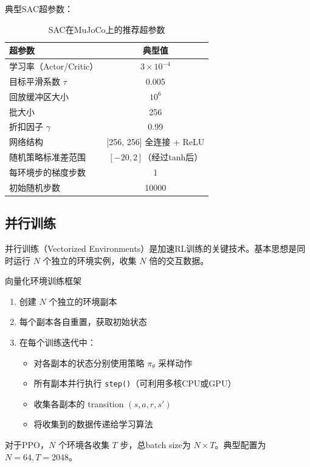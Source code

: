 典型SAC超参数：
\begin{table}[htbp]
\centering
\caption{SAC在MuJoCo上的推荐超参数}
\label{tab:sac_hp}
\begin{tabular}{lc}
\toprule
超参数 & 典型值 \\
\midrule
学习率（Actor/Critic） & $3 \times 10^{-4}$ \\
目标平滑系数 $\tau$ & 0.005 \\
回放缓冲区大小 & $10^6$ \\
批大小 & 256 \\
折扣因子 $\gamma$ & 0.99 \\
网络结构 & [256, 256] 全连接 + ReLU \\
随机策略标准差范围 & $[-20, 2]$（经过tanh后） \\
每环境步的梯度步数 & 1 \\
初始随机步数 & 10000 \\
\bottomrule
\end{tabular}
\end{table}

\subsection{并行训练}

并行训练（Vectorized Environments）是加速RL训练的关键技术。基本思想是同时运行 $N$ 个独立的环境实例，收集 $N$ 倍的交互数据。

\begin{myalgorithm}{向量化环境训练框架}
\begin{enumerate}
    \item 创建 $N$ 个独立的环境副本
    \item 每个副本各自重置，获取初始状态
    \item 在每个训练迭代中：
    \begin{itemize}
        \item 对各副本的状态分别使用策略 $\pi_\theta$ 采样动作
        \item 所有副本并行执行 \texttt{step()}（可利用多核CPU或GPU）
        \item 收集各副本的 transition $(s, a, r, s')$
        \item 将收集到的数据传递给学习算法
    \end{itemize}
\end{enumerate}
\end{myalgorithm}

对于PPO，$N$ 个环境各收集 $T$ 步，总batch size为 $N \times T$。典型配置为 $N=64, T=2048$。

